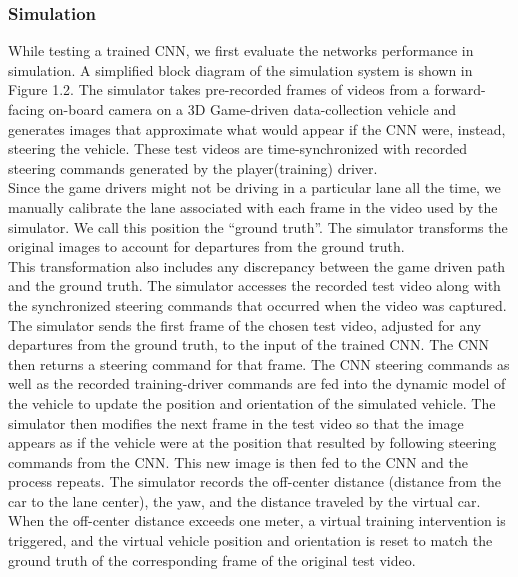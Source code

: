 \subsubsection{Simulation}
While testing a trained CNN, we first evaluate the networks performance in simulation. A simplified block diagram of the simulation system is shown in Figure 1.2. The simulator takes pre-recorded frames of videos from a forward-facing on-board camera on a 3D Game-driven data-collection vehicle and generates images that approximate what would appear if the CNN were, instead, steering the vehicle. These test videos are time-synchronized with recorded steering commands generated by the player(training) driver.\\

Since the game drivers might not be driving in a particular lane all the time, we manually calibrate the lane associated with each frame in the video used by the simulator. We call this position the “ground truth”. The simulator transforms the original images to account for departures from the ground truth.\\

This transformation also includes any discrepancy between the game driven path and the ground truth. The simulator accesses the recorded test video along with the synchronized steering commands that occurred when the video was captured. The simulator sends the first frame of the chosen test video, adjusted for any departures from the ground truth, to the input of the trained CNN. The CNN then returns a steering command for that frame. The CNN steering commands as well as the recorded training-driver commands are fed into the dynamic model of the vehicle to update the position and orientation of the simulated vehicle. The simulator then modifies the next frame in the test video so that the image appears as if the vehicle were at the position that resulted by following steering commands from the CNN. This new image is then fed to the CNN and the process repeats. The simulator records the off-center distance (distance from the car to the lane center), the yaw, and the distance traveled by the virtual car. When the off-center distance exceeds one meter, a virtual training intervention is triggered, and the virtual vehicle position and orientation is reset to match the ground truth of the corresponding frame of the original test video. 
